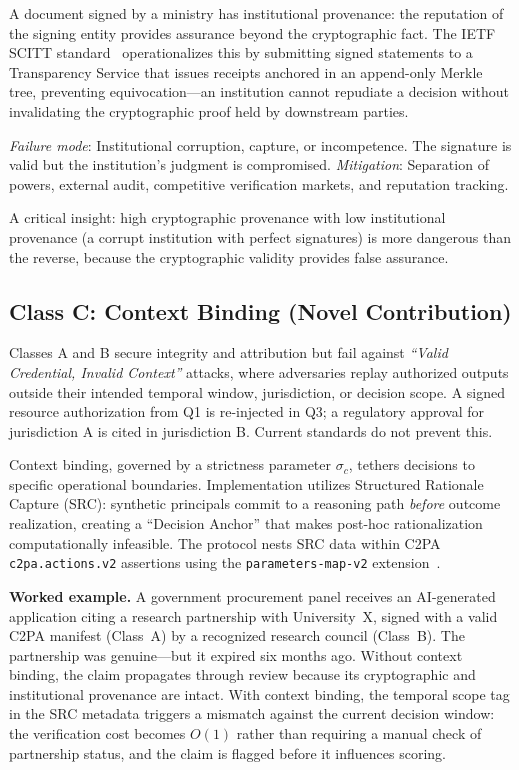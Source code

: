 \documentclass[runningheads]{llncs}
\begin{document}
A document signed by a ministry has institutional provenance: the reputation of the signing entity provides assurance beyond the cryptographic fact. The IETF SCITT standard~\cite{birkholz2025scitt} operationalizes this by submitting signed statements to a Transparency Service that issues receipts anchored in an append-only Merkle tree, preventing equivocation---an institution cannot repudiate a decision without invalidating the cryptographic proof held by downstream parties.

\emph{Failure mode}: Institutional corruption, capture, or incompetence. The signature is valid but the institution's judgment is compromised. \emph{Mitigation}: Separation of powers, external audit, competitive verification markets, and reputation tracking.

A critical insight: high cryptographic provenance with low institutional provenance (a corrupt institution with perfect signatures) is more dangerous than the reverse, because the cryptographic validity provides false assurance.

\subsection{Class C: Context Binding (Novel Contribution)}
\label{sec:contextbinding}

Classes A and B secure integrity and attribution but fail against \emph{``Valid Credential, Invalid Context''} attacks, where adversaries replay authorized outputs outside their intended temporal window, jurisdiction, or decision scope. A signed resource authorization from Q1 is re-injected in Q3; a regulatory approval for jurisdiction A is cited in jurisdiction B. Current standards do not prevent this.

Context binding, governed by a strictness parameter $\sigma_c$, tethers decisions to specific operational boundaries. Implementation utilizes Structured Rationale Capture (SRC): synthetic principals commit to a reasoning path \emph{before} outcome realization, creating a ``Decision Anchor'' that makes post-hoc rationalization computationally infeasible. The protocol nests SRC data within C2PA \texttt{c2pa.actions.v2} assertions using the \texttt{parameters-map-v2} extension~\cite{c2pa2024}.

\textbf{Worked example.} A government procurement panel receives an AI-generated application citing a research partnership with University~X, signed with a valid C2PA manifest (Class~A) by a recognized research council (Class~B). The partnership was genuine---but it expired six months ago. Without context binding, the claim propagates through review because its cryptographic and institutional provenance are intact. With context binding, the temporal scope tag in the SRC metadata triggers a mismatch against the current decision window: the verification cost becomes $O(1)$ rather than requiring a manual check of partnership status, and the claim is flagged before it influences scoring.
\end{document}
